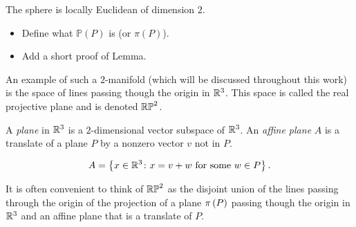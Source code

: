\documentclass{amsart}
\begin{document}
	\begin{example}
		The sphere is locally Euclidean of dimension $2$.
	\end{example}
	
	\begin{tcolorbox}
		\begin{itemize}
			\item Define what $\mathbb P(P)$ is (or $\pi(P)$).
			\item Add a short proof of Lemma.
		\end{itemize}
	\end{tcolorbox}

	An example of such a $2$-manifold (which will be discussed throughout this work) is the space of lines passing though the origin in $\mathbb{R}^3$. This space is called the real projective plane and is denoted $\mathbb{RP}^2$.
	
	\begin{definition}
		\label{def:plane-affine}
		A \emph{plane} in $\mathbb{R}^3$ is a $2$-dimensional vector subspace of $\mathbb{R}^3$. An \emph{affine plane} $A$ is a translate of a plane $P$ by a nonzero vector $v$ not in $P$. 
		
		\begin{equation*}
			A = \left\{x \in \mathbb{R}^3 \colon x = v + w \text{ for some } w \in P\right\}.
		\end{equation*}
	\end{definition}
	
	It is often convenient to think of $\mathbb{RP}^2$ as the disjoint union of the lines passing through the origin of the projection of a plane $\pi\left(P\right)$ passing though the origin in $\mathbb{R}^3$ and an affine plane that is a translate of $P$.
	
\end{document}
